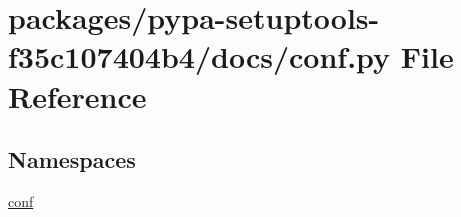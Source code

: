 \hypertarget{pypa-setuptools-f35c107404b4_2docs_2conf_8py}{}\section{packages/pypa-\/setuptools-\/f35c107404b4/docs/conf.py File Reference}
\label{pypa-setuptools-f35c107404b4_2docs_2conf_8py}
\subsection*{Namespaces}
\begin{DoxyCompactItemize}
\item 
 \hyperlink{namespaceconf}{conf}
\end{DoxyCompactItemize}
